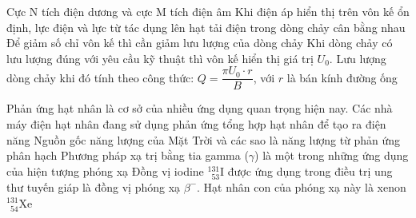 \begin{ex}
		{Cực N tích điện dương và cực M tích điện âm}
		{\True Khi điện áp hiển thị trên vôn kế ổn định, lực điện và lực từ tác dụng lên hạt tải điện trong dòng chảy cân bằng nhau}
		{\True Để giảm số chỉ vôn kế thì cần giảm lưu lượng của dòng chảy}
		{Khi dòng chảy có lưu lượng đúng với yêu cầu kỹ thuật thì vôn kế hiển thị giá trị $U_0$. Lưu lượng dòng chảy khi đó tính theo công thức: $Q=\dfrac{\pi U_0\cdot r}{B}$, với $r$ là bán kính đường ống}
	\end{ex}

	\begin{ex}%
		Phản ứng hạt nhân là cơ sở của nhiều ứng dụng quan trọng hiện nay.
		\choiceTFt
		{Các nhà máy điện hạt nhân đang sử dụng phản ứng tổng hợp hạt nhân để tạo ra điện năng}
		{Nguồn gốc năng lượng của Mặt Trời và các sao là năng lượng từ phản ứng phân hạch}
		{\True Phương pháp xạ trị bằng tia gamma ($\gamma$) là một trong những ứng dụng của hiện tượng phóng xạ}
		{\True Đồng vị iodine ${}^{131}_{\phantom{1}53}\text{I}$ được ứng dụng trong điều trị ung thư tuyến giáp là đồng vị phóng xạ $\beta^-$. Hạt nhân con của phóng xạ này là xenon ${}^{131}_{\phantom{1}54}\text{Xe}$}
	\end{ex}

